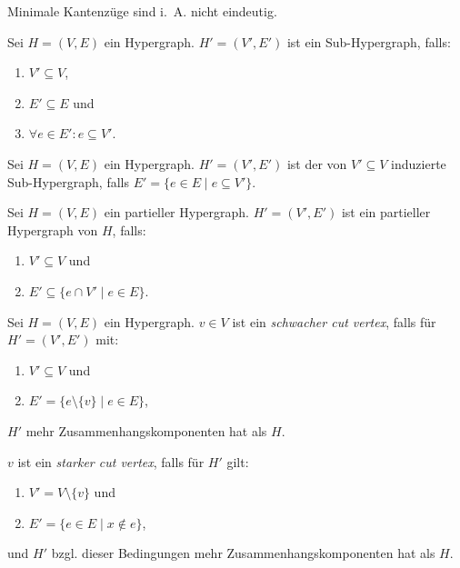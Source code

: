 \begin{remark}
    Minimale Kantenzüge sind i.~A. nicht eindeutig.
\end{remark}

\begin{definition}
    Sei $ H = (V, E) $ ein Hypergraph.
    $ H' = (V', E') $ ist ein Sub-Hypergraph, falls:
    \begin{enumerate}
        \item $ V' \subseteq V $,
        \item $ E' \subseteq E $ und
        \item $ \forall e \in E': e \subseteq V' $.
    \end{enumerate}
\end{definition}

\begin{definition}
    Sei $ H = (V, E) $ ein Hypergraph.
    $ H' = (V', E') $ ist der von $ V' \subseteq V $ induzierte Sub-Hypergraph, falls $ E' = \{ e \in E \mid e \subseteq V' \} $.
\end{definition}

\begin{definition}
    Sei $ H = (V, E) $ ein partieller Hypergraph.
    $ H' = (V', E') $ ist ein partieller Hypergraph von $ H $, falls:
    \begin{enumerate}
        \item $ V' \subseteq V $ und
        \item $ E' \subseteq \{ e \cap V' \mid e \in E \} $.
    \end{enumerate}
\end{definition}

\begin{definition}
    Sei $ H = (V, E) $ ein Hypergraph.
    $ v \in V $ ist ein \textit{schwacher cut vertex}, falls für $ H' = (V', E') $ mit:
    \begin{enumerate}
        \item $ V' \subseteq V $ und
        \item $ E' = \{ e \setminus \{ v \} \mid e \in E \} $,
    \end{enumerate}
    $ H' $ mehr Zusammenhangskomponenten hat als $ H $.

    $ v $ ist ein \textit{starker cut vertex}, falls für $ H' $ gilt:
    \begin{enumerate}
        \item $ V' = V \setminus \{ v \} $ und
        \item $ E' = \{ e \in E \mid x \notin e \} $,
    \end{enumerate}
    und $ H' $ bzgl. dieser Bedingungen mehr Zusammenhangskomponenten hat als $ H $.
\end{definition}

